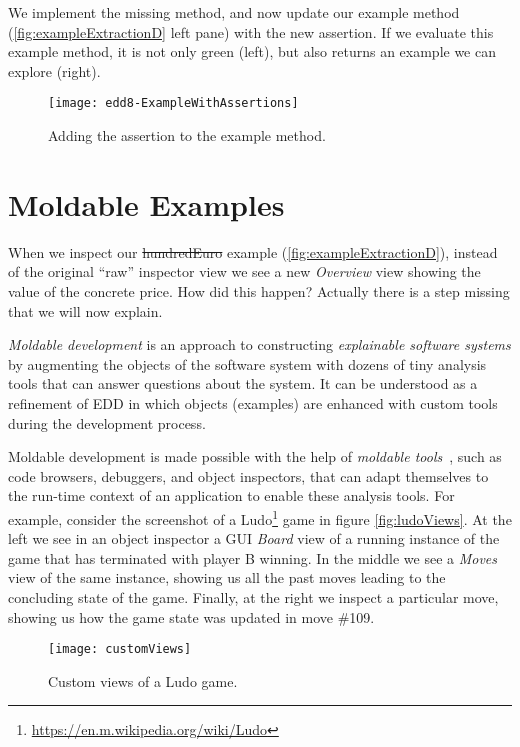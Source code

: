 \documentclass[sigplan,anonymous,review,10pt]{acmart}
\begin{document}
We implement the missing method, and now update our example method (\autoref{fig:exampleExtractionD} left pane) with the new assertion.
If we evaluate this example method, it is not only green (left), but also returns an example we can explore (right).

\begin{figure}[h]
  \texttt{[image: edd8-ExampleWithAssertions]}
	\caption{Adding the assertion to the example method.}
  \label{fig:exampleExtractionD}
\end{figure}

\section{Moldable Examples}\label{sec:moldable}

When we inspect our \st{hundredEuro} example (\autoref{fig:exampleExtractionD}), instead of the original ``raw'' inspector view we see a new \emph{Overview} view showing the value of the concrete price.
How did this happen?
Actually there is a step missing that we will now explain.

\emph{Moldable development} is an approach to constructing \emph{explainable software systems} by augmenting the objects of the software system with dozens of tiny analysis tools that can answer questions about the system.
It can be understood as a refinement of EDD in which objects (examples) are enhanced with custom tools during the development process.

Moldable development is made possible with the help of \emph{moldable tools}~\cite{Chis17a}, such as code browsers, debuggers, and object inspectors, that can adapt themselves to the run-time context of an application to enable these analysis tools.
For example, consider the screenshot of a Ludo\footnote{\url{https://en.m.wikipedia.org/wiki/Ludo}} game in figure \autoref{fig:ludoViews}.
At the left we see in an object inspector a GUI \emph{Board} view of a running instance of the game that has terminated with player B winning.
In the middle we see a \emph{Moves} view of the same instance, showing us all the past moves leading to the concluding state of the game.
Finally, at the right we inspect a particular move, showing us how the game state was updated in move \#109.

\begin{figure}[h]
  \texttt{[image: customViews]}
  \caption{Custom views of a Ludo game.}
  \label{fig:ludoViews}
\end{figure}
\end{document}
